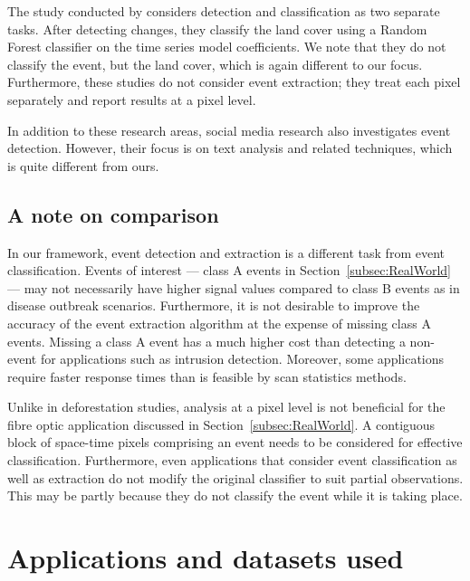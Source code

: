 \documentclass[a4paper,11pt]{article}
\begin{document}
The study conducted by \cite{zhu2014continuous} considers detection and classification as two separate tasks. After detecting changes, they classify the land cover using a Random Forest classifier on the time series model coefficients. We note that they do not classify the event, but the land cover, which is again different to our focus. Furthermore, these studies do not consider event extraction; they treat each pixel separately and report results at a pixel level.

In addition to these research areas, social media research \citep{atefeh2015survey} also investigates event detection. However, their focus is on text analysis and related techniques, which is quite different from ours.

\subsection{A note on comparison}

In our framework, event detection and extraction is a different task from event classification. Events of interest --- class A events in Section~\ref{subsec:RealWorld} --- may not necessarily have higher signal values compared to class B events as in disease outbreak scenarios. Furthermore, it is not desirable to improve the accuracy of the event extraction algorithm at the expense of missing class A events. Missing a class A event has a much higher cost than detecting a non-event for applications such as intrusion detection. Moreover, some applications require faster response times than is feasible by scan statistics methods.

Unlike in deforestation studies, analysis at a pixel level is not beneficial for the fibre optic application discussed in Section~\ref{subsec:RealWorld}. A contiguous block of space-time pixels comprising an event needs to be considered for effective classification. Furthermore, even applications that consider event classification as well as extraction do not modify the original classifier to suit partial observations. This may be partly because they do not classify the event while it is taking place.

\section{Applications and datasets used}\label{sec:data}
\end{document}
